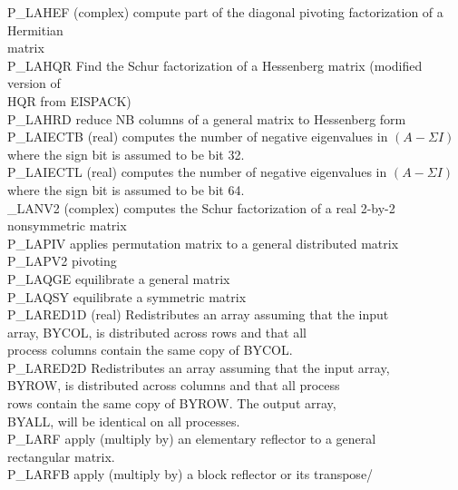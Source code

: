 \documentclass[11pt]{report}
\begin{document}
\begin{tabbing}
P\_LAHEF \> (complex) compute part of the diagonal pivoting factorization of a Hermitian \\
        \> matrix\\
P\_LAHQR \> Find the Schur factorization of a Hessenberg matrix (modified version of \\
        \> HQR from EISPACK)\\
P\_LAHRD \> reduce NB columns of a general matrix to Hessenberg form\\
P\_LAIECTB \> (real) computes the number of negative eigenvalues in $(A- \Sigma I)$ \\
          \> where the sign bit is assumed to be bit 32.\\
P\_LAIECTL \> (real) computes the number of negative eigenvalues in $(A- \Sigma I)$ \\
          \> where the sign bit is assumed to be bit 64.\\
\_LANV2 \> (complex) computes the Schur factorization of a real 2-by-2 nonsymmetric matrix \\
P\_LAPIV \> applies permutation matrix to a general distributed matrix \\
P\_LAPV2 \> pivoting \\
P\_LAQGE \> equilibrate a general matrix \\
P\_LAQSY \> equilibrate a symmetric matrix \\
P\_LARED1D \> (real) Redistributes an array assuming that the input \\
         \> array, BYCOL, is distributed across rows and that all \\
         \> process columns contain the same copy of BYCOL.\\
P\_LARED2D \> Redistributes an array assuming that the input array, \\
         \> BYROW, is distributed across columns and that all process \\
         \> rows contain the same copy of BYROW.  The output array, \\
         \> BYALL, will be identical on all processes.\\
P\_LARF  \> apply (multiply by) an elementary reflector to a general \\
         \> rectangular matrix.\\
P\_LARFB \> apply (multiply by) a block reflector or its transpose/ \\

\end{tabbing}
\end{document}
